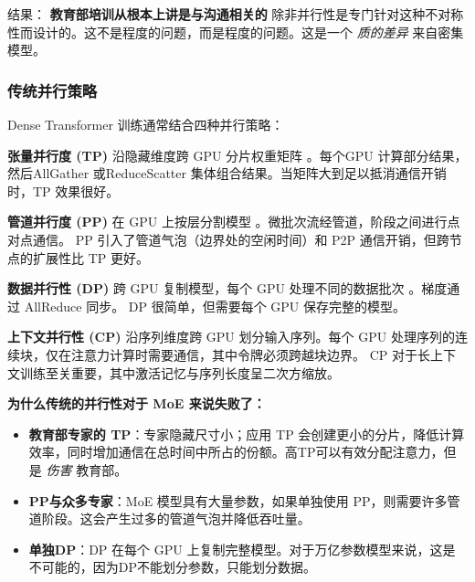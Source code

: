 结果： \textbf{教育部培训从根本上讲是与沟通相关的} 除非并行性是专门针对这种不对称性而设计的。这不是程度的问题，而是程度的问题。这是一个 \emph{质的差异} 来自密集模型。

\subsubsection{传统并行策略}\label{sec:traditional-parallelism}

Dense Transformer 训练通常结合四种并行策略：

\textbf{张量并行度 (TP)} 沿隐藏维度跨 GPU 分片权重矩阵 \cite{shoeybi2020megatronlmtrainingmultibillionparameter}。每个GPU 计算部分结果，然后AllGather 或ReduceScatter 集体组合结果。当矩阵大到足以抵消通信开销时，TP 效果很好。

\textbf{管道并行度 (PP)} 在 GPU 上按层分割模型 \cite{huang2019gpipe,narayanan2019pipedream,shoeybi2020megatronlmtrainingmultibillionparameter,qi2023zerobubblepipelineparallelism,qi2024pipelineparallelismcontrollablememory,zhang2022chimera,guan2025pipeoptimensuringeffective1f1b}。微批次流经管道，阶段之间进行点对点通信。 PP 引入了管道气泡（边界处的空闲时间）和 P2P 通信开销，但跨节点的扩展性比 TP 更好。

\textbf{数据并行性 (DP)} 跨 GPU 复制模型，每个 GPU 处理不同的数据批次 \cite{shallue2019measuringeffectsdataparallelism,bai2022moderndistributeddataparallellargescale}。梯度通过 AllReduce 同步。 DP 很简单，但需要每个 GPU 保存完整的模型。

\textbf{上下文并行性 (CP)} \cite{korthikanti2023sequence,liu2023ringattention,jacobs2023deepspeedulysses} 沿序列维度跨 GPU 划分输入序列。每个 GPU 处理序列的连续块，仅在注意力计算时需要通信，其中令牌必须跨越块边界。 CP 对于长上下文训练至关重要，其中激活记忆与序列长度呈二次方缩放。

\textbf{为什么传统的并行性对于 MoE 来说失败了：}

\begin{itemize}
    \item \textbf{教育部专家的 TP}：专家隐藏尺寸小；应用 TP 会创建更小的分片，降低计算效率，同时增加通信在总时间中所占的份额。高TP可以有效分配注意力，但是 \emph{伤害} 教育部。
    \item \textbf{PP与众多专家}：MoE 模型具有大量参数，如果单独使用 PP，则需要许多管道阶段。这会产生过多的管道气泡并降低吞吐量。
    \item \textbf{单独DP}：DP 在每个 GPU 上复制完整模型。对于万亿参数模型来说，这是不可能的，因为DP不能划分参数，只能划分数据。
\end{itemize}

